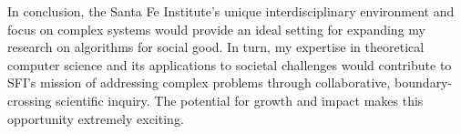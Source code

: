 \documentclass[11pt]{article}
\begin{document}
{In conclusion, the Santa Fe Institute's unique interdisciplinary environment and focus on complex systems would provide an ideal setting for expanding my research on algorithms for social good. In turn, my expertise in theoretical computer science and its applications to societal challenges would contribute to SFI's mission of addressing complex problems through collaborative, boundary-crossing scientific inquiry. The potential for growth and impact makes this opportunity extremely exciting.
}
\end{document}
